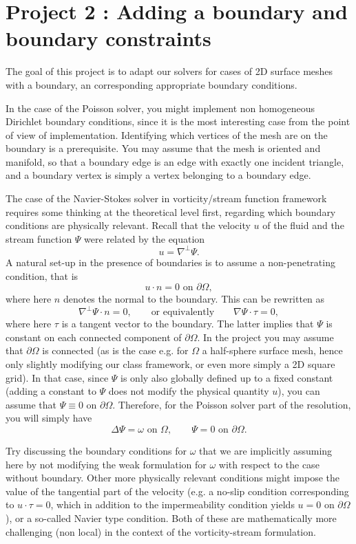 \documentclass[11pt]{article}
\begin{document}
\pagebreak

\section*{Project 2 : Adding a boundary and boundary constraints}
The goal of this project is to adapt our solvers for cases of
2D surface meshes with a boundary, an corresponding appropriate 
boundary conditions.

In the case of the Poisson solver, you might implement non homogeneous
Dirichlet boundary conditions, since it is the most interesting case 
from the point of view of implementation. Identifying which vertices
of the mesh are on the boundary is a prerequisite. You may assume that
the mesh is oriented and manifold, so that a boundary edge is an edge 
with exactly one incident triangle, and a boundary vertex is simply a  
vertex belonging to a boundary edge.  

The case of the Navier-Stokes solver in vorticity/stream function framework 
requires some thinking at the theoretical level first, regarding which 
boundary conditions are physically relevant. Recall that 
the velocity $u$ of the fluid and the stream function $\Psi$ were related
by the equation  
$$
u = \nabla^\perp \Psi.
$$
A natural set-up in the presence of boundaries is to assume a 
non-penetrating condition, that is
$$
u \cdot n = 0 \text{ on } \partial \Omega,
$$
where here $n$ denotes the normal to the boundary. This can be rewritten as
$$
\nabla^\perp\Psi \cdot n = 0, \qquad \text{or equivalently} \qquad   \nabla \Psi
\cdot \tau = 0,
$$
where here $\tau$ is a tangent vector to the boundary. The latter implies that 
$\Psi$ is constant on each connected component of $\partial \Omega.$ In the project
you may assume that $\partial \Omega$ is connected (as is the case e.g. for
$\Omega$ a half-sphere surface mesh, hence only slightly modifying our class 
framework, or even more simply a 2D square grid). In that case, since $\Psi$ is 
only also globally defined up to a fixed constant (adding a constant to $\Psi$
does not modify the physical quantity $u$), you can assume that 
$\Psi \equiv 0$ on $\partial \Omega.$ Therefore, for the Poisson solver part of
the resolution, you will simply have
$$
\Delta \Psi = \omega \text{ on } \Omega,\qquad \Psi = 0 \text{ on } \partial
\Omega. 
$$

 Try discussing the 
boundary conditions for $\omega$ that we are implicitly assuming here 
by not modifying the weak formulation for $\omega$ with respect to the
case without boundary. Other more physically relevant conditions might 
impose the value of the tangential part of the velocity (e.g. a 
no-slip condition corresponding to $u \cdot \tau = 0$, which in addition to
the impermeability condition yields $u = 0$ on $\partial \Omega$), or a 
so-called Navier type condition. Both of these are mathematically more 
challenging (non local) in the context of the vorticity-stream formulation.
\end{document}
